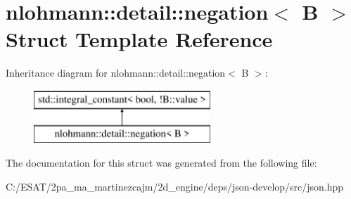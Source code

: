 \hypertarget{structnlohmann_1_1detail_1_1negation}{}\section{nlohmann\+:\+:detail\+:\+:negation$<$ B $>$ Struct Template Reference}
\label{structnlohmann_1_1detail_1_1negation}
Inheritance diagram for nlohmann\+:\+:detail\+:\+:negation$<$ B $>$\+:\begin{figure}[H]
\begin{center}
\leavevmode
\includegraphics[height=2.000000cm]{structnlohmann_1_1detail_1_1negation}
\end{center}
\end{figure}


The documentation for this struct was generated from the following file\+:\begin{DoxyCompactItemize}
\item 
C\+:/\+E\+S\+A\+T/2pa\+\_\+ma\+\_\+martinezcajm/2d\+\_\+engine/deps/json-\/develop/src/json.\+hpp\end{DoxyCompactItemize}
